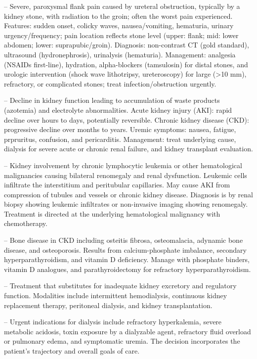 -- Severe, paroxysmal flank pain caused by ureteral obstruction, typically by a kidney stone, with radiation to the groin; often the worst pain experienced. Features: sudden onset, colicky waves, nausea/vomiting, hematuria, urinary urgency/frequency; pain location reflects stone level (upper: flank; mid: lower abdomen; lower: suprapubic/groin). Diagnosis: non-contrast CT (gold standard), ultrasound (hydronephrosis), urinalysis (hematuria). Management: analgesia (NSAIDs first-line), hydration, alpha-blockers (tamsulosin) for distal stones, and urologic intervention (shock wave lithotripsy, ureteroscopy) for large (>10 mm), refractory, or complicated stones; treat infection/obstruction urgently.

-- Decline in kidney function leading to accumulation of waste products (azotemia) and electrolyte abnormalities. Acute kidney injury (AKI): rapid decline over hours to days, potentially reversible. Chronic kidney disease (CKD): progressive decline over months to years. Uremic symptoms: nausea, fatigue, prpruritus, confusion, and pericarditis. Management: treat underlying cause, dialysis for severe acute or chronic renal failure, and kidney transplant evaluation.

-- Kidney involvement by chronic lymphocytic leukemia or other hematological malignancies causing bilateral renomegaly and renal dysfunction. Leukemic cells infiltrate the interstitium and peritubular capillaries. May cause AKI from compression of tubules and vessels or chronic kidney disease. Diagnosis is by renal biopsy showing leukemic infiltrates or non-invasive imaging showing renomegaly. Treatment is directed at the underlying hematological malignancy with chemotherapy.

-- Bone disease in CKD including osteitis fibrosa, osteomalacia, adynamic bone disease, and osteoporosis. Results from calcium-phosphate imbalance, secondary hyperparathyroidism, and vitamin D deficiency. Manage with phosphate binders, vitamin D analogues, and parathyroidectomy for refractory hyperparathyroidism.

-- Treatment that substitutes for inadequate kidney excretory and regulatory function. Modalities include intermittent hemodialysis, continuous kidney replacement therapy, peritoneal dialysis, and kidney transplantation.

-- Urgent indications for dialysis include refractory hyperkalemia, severe metabolic acidosis, toxin exposure by a dialyzable agent, refractory fluid overload or pulmonary edema, and symptomatic uremia. The decision incorporates the patient’s trajectory and overall goals of care.


